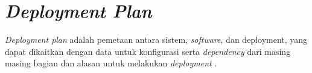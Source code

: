 \section{\textit{Deployment Plan}}

\textit{Deployment plan} adalah pemetaan antara sistem, \textit{software}, dan deployment, yang dapat dikaitkan dengan data untuk konfigurasi serta \textit{dependency} dari masing masing bagian dan alasan untuk melakukan \textit{deployment} \parencite{ARCANGELI2015198}.